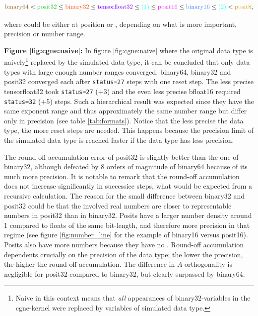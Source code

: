 \documentclass{article}
\theoremstyle{plain} %
\theoremstyle{convention} %
\theoremstyle{remark} %
\def\code#1{\texttt{#1}}
\numberwithin{equation}{section}
\begin{document}
\begin{align}
    \textcolor{cbrown}{\text{binary64}} < \textcolor{cgreen}{\text{posit32}} \leq \textcolor{cred}{\text{binary32}} \leq \textcolor{cpurple}{\text{tensorfloat32}} \leq \textcolor{cturquois}{\text{(1)}} \leq \textcolor{cpink}{\text{posit16}} \leq \textcolor{cblue}{\text{binary16}} \leq \textcolor{cturquois}{\text{(2)}} < \textcolor{cyellow}{\text{posit8}}, \label{eq:hierarchy}
\end{align}

where \textcolor{cturquois}{} could be either at position \textcolor{cturquois}{} or \textcolor{cturquois}{}, depending on what is more important, precision or number range.

\textbf{Figure \ref{fig:cgne:naive}:} In figure \ref{fig:cgne:naive} where the original data type is naively\footnote{Naive in this context means that \textit{all} appearances of binary32-variables in the cgne-kernel were replaced by variables of simulated data type.} replaced by the simulated data type, it can be concluded that only data types with large enough number ranges converged. \gls{binary64}, \gls{binary32} and \gls{posit32} converged each after \code{status=27} steps with one reset step. The less precise \gls{tensorfloat32} took \code{status=27} ($+3$) and the even less precise \gls{bfloat16} required \code{status=32} ($+5$) steps. Such a hierarchical result was expected since they have the same exponent range and thus approximately the same number range but differ only in precision (see table \ref{tab:formats}). Notice that the less precise the data type, the more reset steps are needed. This happens because the precision limit of the simulated data type is reached faster if the data type has less precision.

The round-off accumulation error of \gls{posit32} is slightly better than the one of \gls{binary32}, although defeated by $8$ orders of magnitude of \gls{binary64} because of its much more precision. It is notable to remark that the round-off accumulation does not increase significantly in successice steps, what would be expected from a recursive calculation. The reason for the small difference between \gls{binary32} and \gls{posit32} could be that the involved real numbers are closer to representable numbers in \gls{posit32} than in \gls{binary32}. Posits have a larger number density around \num{1} compared to floats of the same bit-length, and therefore more precision in that regime (see figure \ref{fig:number_line} for the example of \gls{binary16} versus \gls{posit16}). Posits also have more numbers because they have no . Round-off accumulation dependents crucially on the precision of the data type; the lower the precision, the higher the round-off accumulation. The difference in $A$-orthogonality is negligible for \gls{posit32} compared to \gls{binary32}, but clearly surpassed by \gls{binary64}.
\end{document}
